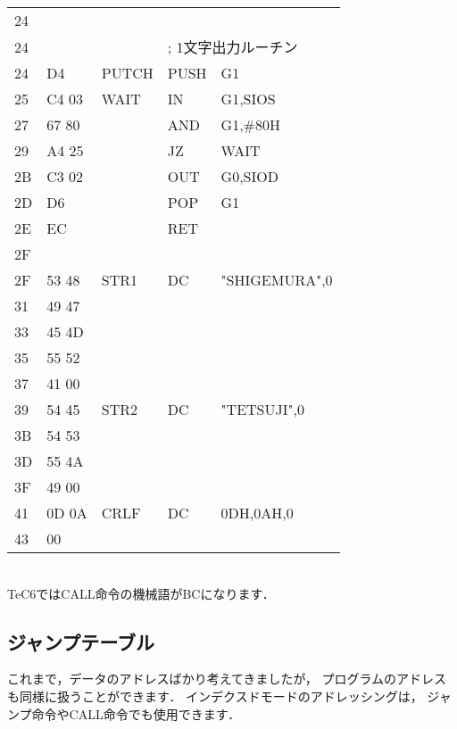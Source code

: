 \begin{center}
{\begin{tabular}{|l|l|l|l l|}
24 &       &         &        &                 \\
24 &       &         & \multicolumn{2}{|l|}{; 1文字出力ルーチン} \\
24 & D4    &  PUTCH  & PUSH   & G1              \\
25 & C4 03 &  WAIT   & IN     & G1,SIOS         \\
27 & 67 80 &         & AND    & G1,\#80H        \\
29 & A4 25 &         & JZ     & WAIT            \\
2B & C3 02 &         & OUT    & G0,SIOD         \\
2D & D6    &         & POP    & G1              \\
2E & EC    &         & RET    &                 \\
2F &       &         &        &                 \\
2F & 53 48 &  STR1   & DC     & "SHIGEMURA",0   \\
31 & 49 47 &         &        &                 \\
33 & 45 4D &         &        &                 \\
35 & 55 52 &         &        &                 \\
37 & 41 00 &         &        &                 \\
39 & 54 45 &  STR2   & DC     & "TETSUJI",0     \\
3B & 54 53 &         &        &                 \\
3D & 55 4A &         &        &                 \\
3F & 49 00 &         &        &                 \\
41 & 0D 0A &  CRLF   & DC     & 0DH,0AH,0       \\
43 & 00    &         &        &                 \\
\hline
\end{tabular}
\\TeC6ではCALL命令の機械語がBCになります．
}
\end{center}


\subsection{ジャンプテーブル}
\label{jmptbl}
これまで，データのアドレスばかり考えてきましたが，
プログラムのアドレスも同様に扱うことができます．
インデクスドモードのアドレッシングは，
ジャンプ命令やCALL命令でも使用できます．


